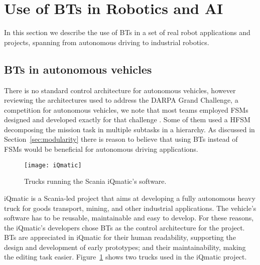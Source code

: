 \section{Use of BTs in Robotics and AI}
\label{sec:use_of_BTs}
In this section we describe the use  of BTs in a set of real robot applications and projects, spanning from autonomous driving to industrial robotics. 

\subsection{BTs in autonomous vehicles}

There is no standard control architecture for autonomous vehicles, however reviewing the architectures used to address the DARPA Grand Challenge, a competition for autonomous vehicles, we note that most teams employed FSMs  designed and developed exactly for that challenge \cite{urmson2008autonomous, urmson2007tartan}. Some of them used a HFSM\cite{montemerlo2008junior} decomposing the mission task in multiple subtasks in a  hierarchy. %
As discussed in Section~\ref{sec:modularity} there is reason to believe that using BTs instead of FSMs would be beneficial for autonomous driving applications.




\begin{figure}[h]
\centering
\texttt{[image: iQmatic]}
\caption[Trucks running the Scania iQmatic's software.]{Trucks running the Scania iQmatic's software.\footnotemark}
\label{bts.fig.iQmatic}
\end{figure}

iQmatic is a Scania-led project that aims at developing a fully autonomous heavy truck for goods transport, mining, and other industrial applications. The vehicle's software has to be reusable, maintainable and easy to develop. For these reasons, the iQmatic's developers chose BTs as the  control architecture  for the project. BTs are appreciated in iQmatic for their human readability,  supporting the design and development of early prototypes; and their maintainability,  making the editing task easier. Figure~\ref{bts.fig.iQmatic} shows two trucks used in the iQmatic project.



